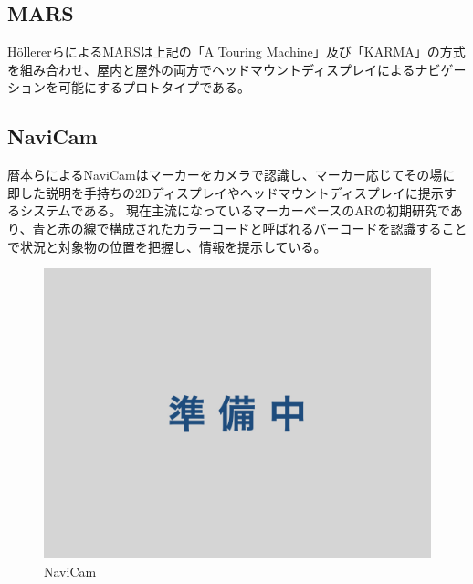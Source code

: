 \subsection{MARS}
HöllererらによるMARS\cite{MARS}は上記の「A Touring Machine」及び「KARMA」の方式を組み合わせ、屋内と屋外の両方でヘッドマウントディスプレイによるナビゲーションを可能にするプロトタイプである。



\subsection{NaviCam}
暦本らによるNaviCam\cite{10.1145/215585.215639}はマーカーをカメラで認識し、マーカー応じてその場に即した説明を手持ちの2Dディスプレイやヘッドマウントディスプレイに提示するシステムである。
現在主流になっているマーカーベースのARの初期研究であり、青と赤の線で構成されたカラーコードと呼ばれるバーコードを認識することで状況と対象物の位置を把握し、情報を提示している。


\begin{figure}[h]
  \centering
  \includegraphics[width=150mm]{images/wip.jpg}
  \caption{NaviCam} \label{fig:NaviCam}
\end{figure}




